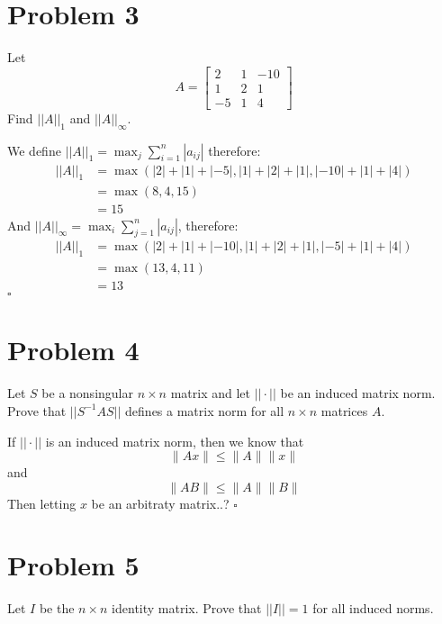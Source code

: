 \documentclass[11pt]{article}
\newenvironment{proof}{\noindent{\bf Proof.}}{\hfill $\square$\medskip}
\begin{document}
\section{Problem 3}
Let
$$A=\begin{bmatrix}
        2  & 1 & -10 \\
        1  & 2 & 1   \\
        -5 & 1 & 4
    \end{bmatrix}$$
Find $||A||_{1}$ and $||A||_{\infty}$.

\begin{proof}
We define $||A||_{1}=\max_{j}\sum_{i=1}^{n}|a_{ij}|$ therefore:
\begin{equation}
    \begin{split}
        ||A||_{1}&=\max(|2|+|1|+|-5|,|1|+|2|+|1|,|-10|+|1|+|4|)\\
        &=\max(8,4,15)\\
        &=15
    \end{split}
\end{equation}
And $||A||_{\infty}=\max_{i}\sum_{j=1}^{n}|a_{ij}|$, therefore:
\begin{equation}
    \begin{split}
        ||A||_{1}&=\max(|2|+|1|+|-10|,|1|+|2|+|1|,|-5|+|1|+|4|)\\
        &=\max(13,4,11)\\
        &=13
    \end{split}
\end{equation}
\end{proof}


\section{Problem 4}
Let $S$ be a nonsingular $n\times n$ matrix and let $||\cdot||$ be an induced matrix norm. Prove that $||S^{-1}AS||$ defines a matrix norm for all $n\times n$ matrices $A$.

\begin{proof}
If $||\cdot||$ is an induced matrix norm, then we know that
$$\lVert Ax\rVert\leq\lVert A\rVert\lVert x\rVert$$
and 
$$\lVert AB\rVert\leq\lVert A\rVert\lVert B\rVert$$
Then letting $x$ be an arbitraty matrix..?
\end{proof}


\section{Problem 5}
Let $I$ be the $n\times n$ identity matrix. Prove that $||I||=1$ for all induced norms.
\end{document}
